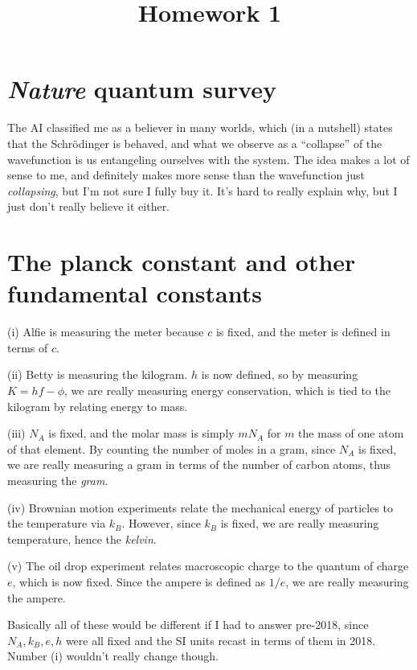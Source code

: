 \documentclass[11pt, letterpaper]{article}
\title{Homework 1}
\begin{document}
\makeproblem

\section{\emph{Nature} quantum survey}

The AI classified me as a believer in many worlds, which (in a nutshell) states that the Schr\"odinger is behaved, and what we observe as a ``collapse'' of the wavefunction is us entangeling ourselves with the system. The idea makes a lot of sense to me, and definitely makes more sense than the wavefunction just \emph{collapsing}, but I'm not sure I fully buy it. It's hard to really explain why, but I just don't really believe it either.

\section{The planck constant and other fundamental constants}

(i) Alfie is measuring the meter because $c$ is fixed, and the meter is defined in terms of $c$.

(ii) Betty is measuring the kilogram. $h$ is now defined, so by measuring $K=hf-\phi $, we are really measuring energy conservation, which is tied to the kilogram by relating energy to mass.

(iii) $N_A$ is fixed, and the molar mass is simply $mN_A$ for $m$ the mass of one atom of that element. By counting the number of moles in a gram, since $N_A$ is fixed, we are really measuring a gram in terms of the number of carbon atoms, thus measuring the \emph{gram}.

(iv) Brownian motion experiments relate the mechanical energy of particles to the temperature via $k_B$. However, since $k_B$ is fixed, we are really measuring temperature, hence the \emph{kelvin}.

(v) The oil drop experiment relates macroscopic charge to the quantum of charge $e$, which is now fixed. Since the ampere is defined as $1/e$, we are really measuring the ampere.

Basically all of these would be different if I had to answer pre-2018, since $N_A,k_B,e,h$ were all fixed and the SI units recast in terms of them in 2018. Number (i) wouldn't really change though.
\end{document}
